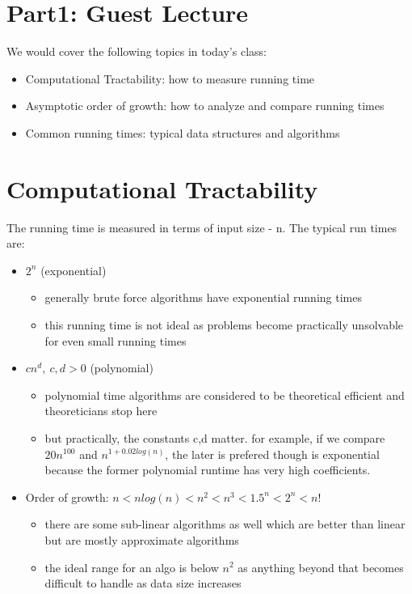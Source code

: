 
\section*{Part1: Guest Lecture}

We would cover the following topics in today's class:
\begin{itemize}
    \item Computational Tractability: how to measure running time 
    \item Asymptotic order of growth: how to analyze and compare running times
    \item Common running times: typical data structures and algorithms
\end{itemize}

\section{Computational Tractability}
The running time is measured in terms of input size - n. The typical run times are:
\begin{itemize}
    \item $2^n$ (exponential)
    \begin{itemize}
        \item generally brute force algorithms have exponential running times
        \item this running time is not ideal as problems become practically unsolvable for even small running times
    \end{itemize}
    \item $cn^d,\ c,d>0$ (polynomial)
    \begin{itemize}
        \item polynomial time algorithms are considered to be theoretical efficient and theoreticians stop here
        \item but practically, the constants c,d matter. for example, if we compare $20n^100$ and $n^{1+0.02log(n)}$, the later is prefered though is exponential because the former polynomial runtime has very high coefficients.
    \end{itemize}
    \item Order of growth: $ n < n log(n) < n^2 < n^3 < 1.5^n < 2^n < n! $
    \begin{itemize}
        \item there are some sub-linear algorithms as well which are better than linear but are mostly approximate algorithms
        \item the ideal range for an algo is below $n^2$ as anything beyond that becomes difficult to handle as data size increases
    \end{itemize}
\end{itemize}

